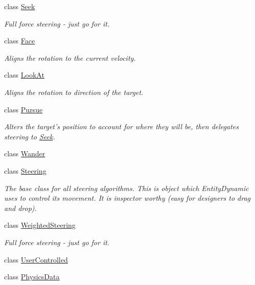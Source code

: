 \begin{DoxyCompactItemize}
class \hyperlink{class_skyrates_1_1_common_1_1_a_i_1_1_seek}{Seek}
\begin{DoxyCompactList}\small\item\em Full force steering -\/ just go for it. \end{DoxyCompactList}\item 
class \hyperlink{class_skyrates_1_1_common_1_1_a_i_1_1_face}{Face}
\begin{DoxyCompactList}\small\item\em Aligns the rotation to the current velocity. \end{DoxyCompactList}\item 
class \hyperlink{class_skyrates_1_1_common_1_1_a_i_1_1_look_at}{Look\-At}
\begin{DoxyCompactList}\small\item\em Aligns the rotation to direction of the target. \end{DoxyCompactList}\item 
class \hyperlink{class_skyrates_1_1_common_1_1_a_i_1_1_pursue}{Pursue}
\begin{DoxyCompactList}\small\item\em Alters the target's position to account for where they will be, then delegates steering to \hyperlink{class_skyrates_1_1_common_1_1_a_i_1_1_seek}{Seek}. \end{DoxyCompactList}\item 
class \hyperlink{class_skyrates_1_1_common_1_1_a_i_1_1_wander}{Wander}
\item 
class \hyperlink{class_skyrates_1_1_common_1_1_a_i_1_1_steering}{Steering}
\begin{DoxyCompactList}\small\item\em The base class for all steering algorithms. This is object which Entity\-Dynamic uses to control its movement. It is inspector worthy (easy for designers to drag and drop). \end{DoxyCompactList}\item 
class \hyperlink{class_skyrates_1_1_common_1_1_a_i_1_1_weighted_steering}{Weighted\-Steering}
\begin{DoxyCompactList}\small\item\em Full force steering -\/ just go for it. \end{DoxyCompactList}\item 
class \hyperlink{class_skyrates_1_1_common_1_1_a_i_1_1_user_controlled}{User\-Controlled}
\item 
class \hyperlink{class_skyrates_1_1_common_1_1_a_i_1_1_physics_data}{Physics\-Data}
\end{DoxyCompactItemize}
